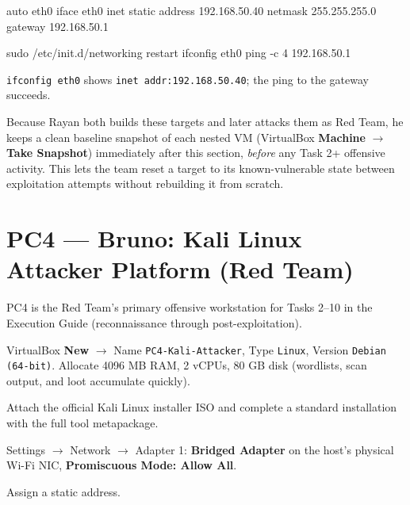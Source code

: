 \documentclass[11pt,a4paper]{article}
\begin{document}
\begin{cmdbox}
\begin{cmdverb}
auto eth0
iface eth0 inet static
    address 192.168.50.40
    netmask 255.255.255.0
    gateway 192.168.50.1
\end{cmdverb}
\end{cmdbox}

\begin{cmdbox}
\begin{cmdverb}
sudo /etc/init.d/networking restart
ifconfig eth0
ping -c 4 192.168.50.1
\end{cmdverb}
\end{cmdbox}

\begin{expectbox}
\texttt{ifconfig eth0} shows \texttt{inet addr:192.168.50.40}; the ping to the gateway
succeeds.
\end{expectbox}

\begin{bluebox}
Because Rayan both builds these targets and later attacks them as Red Team, he keeps a
clean baseline snapshot of each nested VM (VirtualBox \textbf{Machine} $\to$
\textbf{Take Snapshot}) immediately after this section, \emph{before} any Task 2+
offensive activity. This lets the team reset a target to its known-vulnerable state
between exploitation attempts without rebuilding it from scratch.
\end{bluebox}

\clearpage

\section{PC4 --- Bruno: Kali Linux Attacker Platform (Red Team)}
\label{sec:pc4}

PC4 is the Red Team's primary offensive workstation for Tasks 2--10 in the Execution
Guide (reconnaissance through post-exploitation).

\begin{steps}
\item VirtualBox \textbf{New} $\to$ Name \texttt{PC4-Kali-Attacker}, Type
  \texttt{Linux}, Version \texttt{Debian (64-bit)}. Allocate 4096 MB RAM, 2 vCPUs,
  80 GB disk (wordlists, scan output, and loot accumulate quickly).
\item Attach the official Kali Linux installer ISO and complete a standard
  installation with the full tool metapackage.
\item Settings $\to$ Network $\to$ Adapter 1: \textbf{Bridged Adapter} on the host's
  physical Wi-Fi NIC, \textbf{Promiscuous Mode: Allow All}.
\item Assign a static address.
\end{steps}
\end{document}
